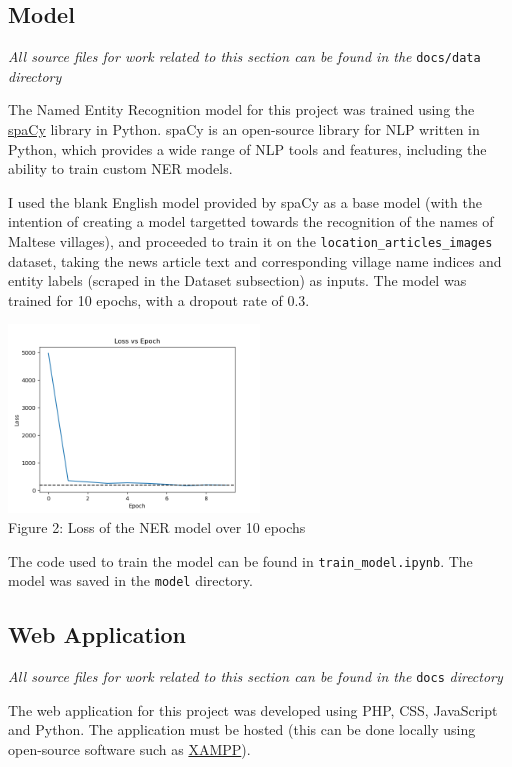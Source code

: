 \documentclass[a4paper, oneside, 11pt]{article}
\begin{document}
\begin{multicols*}{2}
  \subsection{Model}
  \textit{All source files for work related to this section can be found in the} \verb|docs/data| \textit{directory}

  \medskip

  The Named Entity Recognition model for this project was trained using the \href{}{spaCy} library in Python. spaCy is an open-source library for NLP written in Python, which provides a wide range of NLP tools and features, including the ability to train custom NER models.
  
  I used the blank English model provided by spaCy as a base model (with the intention of creating a model targetted towards the recognition of the names of Maltese villages), and proceeded to train it on the \verb|location_articles_images| dataset, taking the news article text and corresponding village name indices and entity labels (scraped in the Dataset subsection) as inputs. The model was trained for 10 epochs, with a dropout rate of 0.3.
  
  \begin{center}
    \includegraphics[width=0.5\textwidth]{./figures/nerloss.png} \\
    Figure 2: Loss of the NER model over 10 epochs
  \end{center}

  The code used to train the model can be found in \verb|train_model.ipynb|. The model was saved in the \verb|model| directory.


  \subsection{Web Application}
  \textit{All source files for work related to this section can be found in the} \verb|docs| \textit{directory}
  
  \medskip

  The web application for this project was developed using PHP, CSS, JavaScript and Python. The application must be hosted (this can be done locally using open-source software such as \href{https://www.apachefriends.org/}{XAMPP}).


\end{multicols*}
\end{document}
